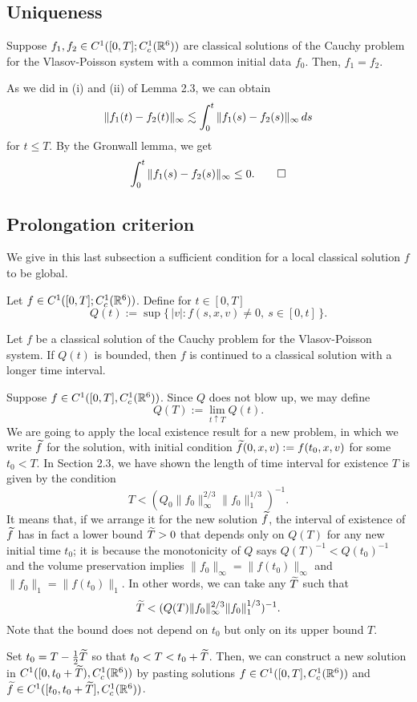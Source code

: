 \documentclass[11pt]{amsart}
\begin{document}
\subsection{Uniqueness}
\begin{thm}[Uniqueness]
Suppose $f_1,f_2\in C^1([0,T];C_c^1(\mathbb{R}^6))$ are classical solutions of the Cauchy problem for the Vlasov-Poisson system with a common initial data $f_0$.
Then, $f_1=f_2$.
\end{thm}
\begin{pf}
As we did in (i) and (ii) of Lemma 2.3, we can obtain
\[\|f_1(t)-f_2(t)\|_\infty\lesssim\int_0^t\|f_1(s)-f_2(s)\|_\infty\,ds\]
for $t\le T$.
By the Gronwall lemma, we get
\[\int_0^t\|f_1(s)-f_2(s)\|_\infty\le0.\qedhere\]
\end{pf}



\subsection{Prolongation criterion}
We give in this last subsection a sufficient condition for a local classical solution $f$ to be global.
\begin{defn}
Let $f\in C^1([0,T];C_c^1(\mathbb{R}^6))$.
Define for $t\in[0,T]$
\[Q(t):=\sup\{\,|v|:f(s,x,v)\ne0,\ s\in[0,t]\,\}.\]
\end{defn}
\begin{prop}
Let $f$ be a classical solution of the Cauchy problem for the Vlasov-Poisson system.
If $Q(t)$ is bounded, then $f$ is continued to a classical solution with a longer time interval.
\end{prop}
\begin{pf}
Suppose $f\in C^1([0,T],C_c^1(\mathbb{R}^6))$.
Since $Q$ does not blow up, we may define
\[Q(T):=\lim_{t\uparrow T}Q(t).\]
We are going to apply the local existence result for a new problem, in which we write $\widetilde f$ for the solution, with initial condition $\widetilde f(0,x,v):=f(t_0,x,v)$ for some $t_0<T$.
In Section 2.3, we have shown the length of time interval for existence $T$ is given by the condition
\[T<(Q_0\|f_0\|_\infty^{2/3}\|f_0\|_1^{1/3})^{-1}.\]
It means that, if we arrange it for the new solution $\widetilde f$, the interval of existence of $\widetilde f$ has in fact a lower bound $\widetilde T>0$ that depends only on $Q(T)$ for any new initial time $t_0$; it is because the monotonicity of $Q$ says $Q(T)^{-1}<Q(t_0)^{-1}$ and the volume preservation implies $\|f_0\|_\infty=\|f(t_0)\|_\infty$ and $\|f_0\|_1=\|f(t_0)\|_1$.
In other words, we can take any $\widetilde T$ such that
\[\widetilde T<(Q(T)\|f_0\|_\infty^{2/3}\|f_0\|_1^{1/3})^{-1}.\]
Note that the bound does not depend on $t_0$ but only on its upper bound $T$.

Set $t_0=T-\frac12\widetilde T$ so that $t_0<T<t_0+\widetilde T$.
Then, we can construct a new solution in $C^1([0,t_0+\widetilde T),C_c^1(\mathbb{R}^6))$ by pasting solutions $f\in C^1([0,T],C_c^1(\mathbb{R}^6))$ and $\widetilde f\in C^1([t_0,t_0+\widetilde T],C_c^1(\mathbb{R}^6))$.
\end{pf}
\end{document}
